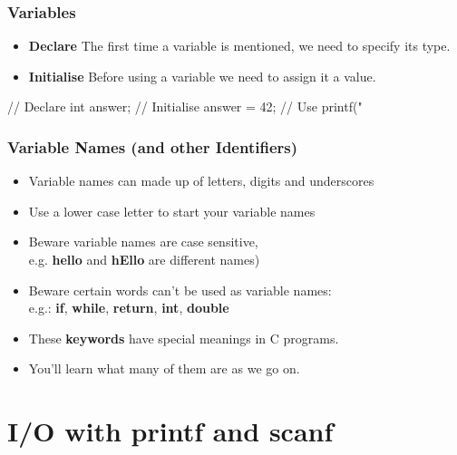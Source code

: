 \begin{frame}[fragile=singleslide]
\frametitle{Variables}

\begin{itemize}
\item {\bf Declare}
The first time a variable is mentioned, we need to specify its type.
\item {\bf Initialise}
Before using a variable we need to assign it a value.
\end{itemize}

\begin{C}
// Declare
int answer;
// Initialise 
answer = 42;
// Use 
printf("%
\end{C}

\end{frame}

\begin{frame}
\frametitle{Variable Names (and other Identifiers)}

\begin{itemize}
\item Variable names can made up of letters, digits and underscores
\item Use a lower case letter to start your variable names
\item Beware variable names are case sensitive, \\
e.g. {\bf hello} and {\bf hEllo} are different names)
\item Beware certain words can't be used as variable names: \\
e.g.: {\bf if}, {\bf while}, {\bf return}, {\bf int}, {\bf double}
\item These {\bf keywords} have special meanings in C programs.
\item You'll learn what many of them  are as we go on.
\end{itemize}
\end{frame}

\section{I/O with printf and scanf}
